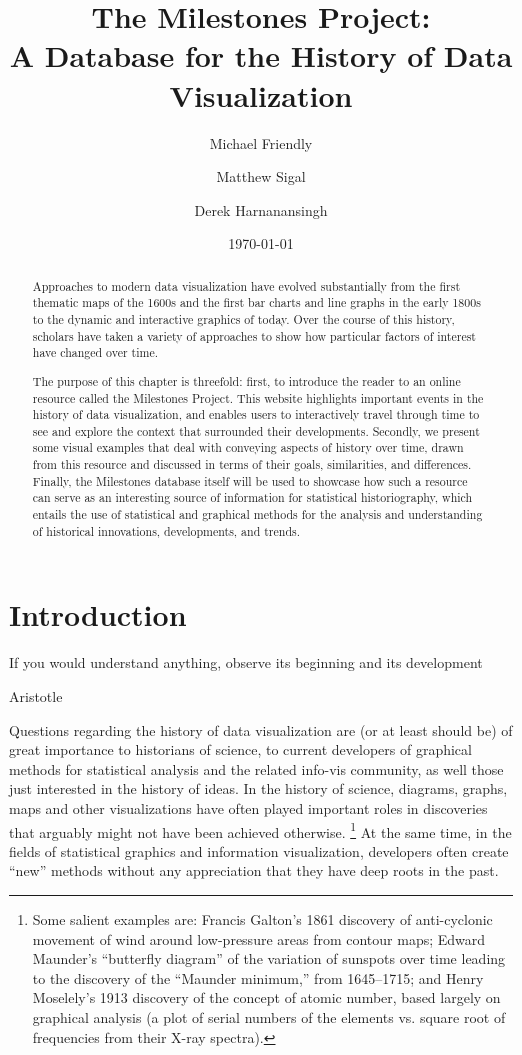 \documentclass[11pt]{article}
\begin{document}
\title{The Milestones Project: \\ A Database for the History of Data Visualization}
\author{Michael Friendly \and Matthew Sigal \and Derek Harnanansingh}
\date{\today}

\maketitle

\begin{abstract}
Approaches to modern data visualization have evolved substantially from the first thematic maps of the 1600s and the
first bar charts and line graphs
in the early 1800s to the dynamic and interactive graphics of today.
Over the course of this history, scholars have taken a variety of approaches to show how particular factors of interest have changed over time.

The purpose of this chapter is threefold: first, to introduce the reader to an online resource called the Milestones Project. This website highlights important events in the history of data visualization, and enables users to interactively travel through time to see and explore
the context that surrounded their developments. Secondly, we present some visual
examples that
deal with conveying aspects of history
over time, drawn from this resource and discussed in terms of their goals, similarities, and differences.
Finally, the Milestones database itself will be used to showcase how such a resource can serve as an interesting source of information for statistical historiography, which entails the use of statistical and graphical methods for the analysis and understanding of historical innovations, developments, and trends.
\end{abstract}


\section{Introduction}
\epigraph{If you would understand anything, observe its beginning and its development}{Aristotle}

Questions regarding the history of data visualization are (or at least should be) of great importance to historians of science,
to current developers of graphical methods for statistical analysis and the related info-vis community, as well
those just interested in the history of ideas.
In the history of science, diagrams, graphs, maps and other visualizations have often played important roles in discoveries
that arguably might not have been achieved otherwise.%
\footnote{
	Some salient examples are:
	Francis Galton's 1861
	discovery of anti-cyclonic movement of wind around low-pressure areas from contour maps;
	Edward Maunder's ``butterfly diagram'' of the variation of sunspots over time leading to the
	discovery of the ``Maunder minimum,'' from 1645--1715;
	and Henry Moselely's 1913 discovery of the concept of atomic number,
	based largely on graphical analysis (a plot of serial numbers of the elements vs.
	square root of frequencies from their X-ray spectra).
}
At the same time,
in the fields of statistical graphics and information visualization,
developers often create ``new'' methods without any appreciation that they have deep roots in the past.
\end{document}
